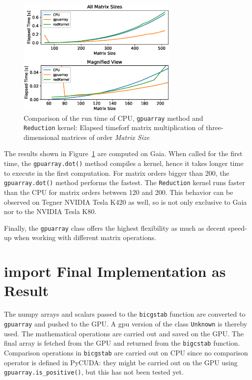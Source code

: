 \documentclass[11pt]{article}
\begin{document}
\begin{figure}[H]
    \centering
    \includegraphics[width=0.7\textwidth]{benchmark003_outData_gaia_K80}
    \caption{Comparison of the run time of CPU, \texttt{gpuarray} method and \texttt{Reduction} kernel: Elapsed timeforf matrix multiplication of three-dimensional matrices of order \emph{Matrix Size}}
    \label{benchmark_007}
\end{figure}

The results shown in Figure~\ref{benchmark_007} are computed on Gaia. When called for the first time, the \texttt{gpuarray.dot()} method compiles a kernel, hence it takes longer time to execute in the first computation. For matrix orders bigger than 200, the \texttt{gpuarray.dot()} method performs the fastest. The \texttt{Reduction} kernel runs faster than the CPU for matrix orders between 120 and 200. This behavior can be observed on Tegner NVIDIA Tesla K420 as well, so is not only exclusive to Gaia nor to the NVIDIA Tesla K80. 

Finally, the \texttt{gpuarray} class offers the highest flexibility as much as decent speed-up when working with different matrix operations.

\section{import Final Implementation as Result}

The numpy arrays and scalars passed to the \texttt{bicgstab} function are converted to \texttt{gpuarray} and pushed to the GPU. A gpu version of the class \texttt{Unknown} is thereby used. The mathematical operations are carried out and saved on the GPU. The final array is fetched from the GPU and returned from the \texttt{bigcstab} function. Comparison operations in \texttt{bicgstab} are carried out on CPU since no comparison operator is defined in PyCUDA: they might be carried out on the GPU using \texttt{gpuarray.is\_positive()}, but this has not been tested yet.
\end{document}
